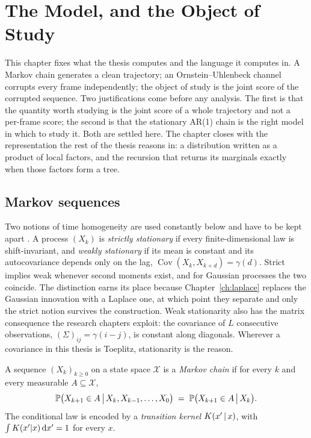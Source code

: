 \chapter{The Model, and the Object of Study}\label{ch:model}
\label{ch:background}\label{ch:graphs}\label{ch:graphical}\label{ch:development}

This chapter fixes what the thesis computes and the language it computes in.
A Markov chain generates a clean trajectory; an Ornstein--Uhlenbeck channel
corrupts every frame independently; the object of study is the joint score of
the corrupted sequence. Two justifications come before any analysis. The first
is that the quantity worth studying is the joint score of a whole trajectory
and not a per-frame score; the second is that the stationary AR(1) chain is the
right model in which to study it. Both are settled here. The chapter closes with the representation the rest of
the thesis reasons in: a distribution written as a product of local factors,
and the recursion that returns its marginals exactly when those factors form a
tree.

\section{Markov sequences}\label{sec:stationarity}\label{sec:markov}

Two notions of time homogeneity are used constantly below and have to be kept
apart \citep{brockwell1991time}. A process $(X_k)$ is \emph{strictly
stationary} if every finite-dimensional law is shift-invariant, and \emph{weakly
stationary} if its mean is constant and its autocovariance depends only on the
lag, $\operatorname{Cov}(X_k, X_{k+d}) = \gamma(d)$. Strict implies weak
whenever second moments exist, and for Gaussian processes the two coincide. The
distinction earns its place because Chapter~\ref{ch:laplace} replaces the
Gaussian innovation with a Laplace one, at which point they separate and only
the strict notion survives the construction. Weak stationarity also has the
matrix consequence the research chapters exploit: the covariance of $L$
consecutive observations, $(\Sigma)_{ij} = \gamma(i-j)$, is constant along
diagonals. Wherever a covariance in this thesis is Toeplitz, stationarity is the
reason.

\begin{definition}
A sequence $(X_k)_{k \geq 0}$ on a state space $\mathcal{X}$ is a \emph{Markov
chain} if for every $k$ and every measurable $A \subseteq \mathcal{X}$,
\begin{equation}
  \mathbb{P}\big(X_{k+1} \in A \,\big|\, X_k, X_{k-1}, \dots, X_0\big)
  \;=\; \mathbb{P}\big(X_{k+1} \in A \,\big|\, X_k\big) .
  \label{eq:markov-property}
\end{equation}
The conditional law is encoded by a \emph{transition kernel}
$K(x' \,|\, x)$, with $\int K(x'|x)\,\mathrm{d} x' = 1$ for every $x$.
\end{definition}

